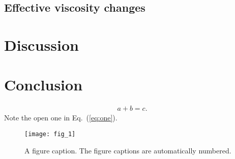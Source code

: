 \documentclass[aps,pre,preprint,groupedaddress,showkeys]{revtex4-2}
\begin{document}
\subsection{Effective viscosity changes}

\section{Discussion}\label{mec}

\section{Conclusion}\label{con}


\begin{eqnarray}
a+b=c
\label{eq:one}.
\end{eqnarray}
Note the open one in Eq.~(\ref{eq:one}).

\begin{figure}
\texttt{[image: fig\_1]}%
\caption{\label{fig:epsart} A figure caption. The figure captions are automatically numbered.}
\end{figure}



%


\end{document}
